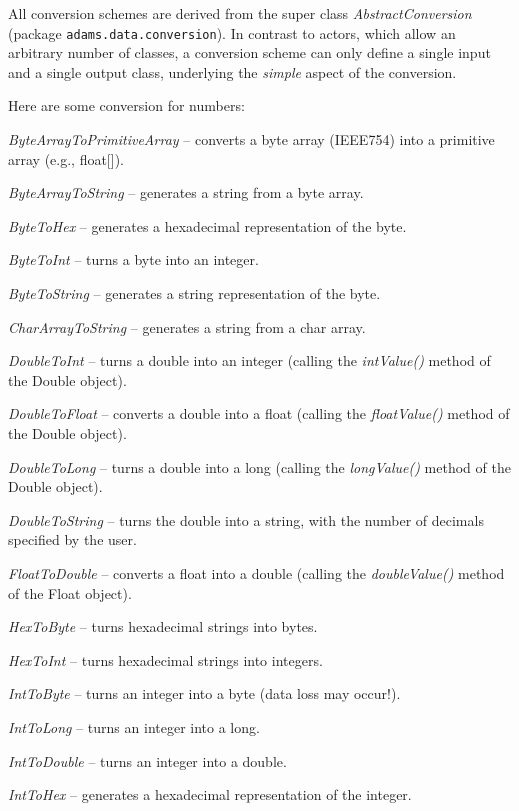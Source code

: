 All conversion schemes are derived from the super class
\textit{AbstractConversion} (package \texttt{adams.data.conversion}).
In contrast to actors, which allow an arbitrary number of classes, a conversion scheme can only define
a single input and a single output class, underlying the \textit{simple} aspect
of the conversion.

Here are some conversion for numbers:
\begin{tight_itemize}
	\item \textit{ByteArrayToPrimitiveArray} -- converts a byte array (IEEE754) into a primitive array (e.g., float[]).
	\item \textit{ByteArrayToString} -- generates a string from a byte array.
	\item \textit{ByteToHex} -- generates a hexadecimal representation of the byte.
	\item \textit{ByteToInt} -- turns a byte into an integer.
	\item \textit{ByteToString} -- generates a string representation of the byte.
  \item \textit{CharArrayToString} -- generates a string from a char array.
	\item \textit{DoubleToInt} -- turns a double into an integer (calling the
	\textit{intValue()} method of the Double object).
	\item \textit{DoubleToFloat} -- converts a double into a float (calling the
	\textit{floatValue()} method of the Double object).
	\item \textit{DoubleToLong} -- turns a double into a long (calling the
	\textit{longValue()} method of the Double object).
	\item \textit{DoubleToString} -- turns the double into a string, with the number
	of decimals specified by the user.
	\item \textit{FloatToDouble} -- converts a float into a double (calling the
	\textit{doubleValue()} method of the Float object).
	\item \textit{HexToByte} -- turns hexadecimal strings into bytes.
	\item \textit{HexToInt} -- turns hexadecimal strings into integers.
	\item \textit{IntToByte} -- turns an integer into a byte (data loss may occur!).
	\item \textit{IntToLong} -- turns an integer into a long.
	\item \textit{IntToDouble} -- turns an integer into a double.
	\item \textit{IntToHex} -- generates a hexadecimal representation of the integer.

\end{tight_itemize}
